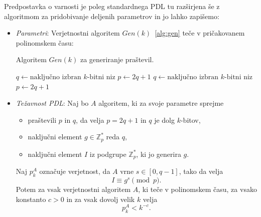 \documentclass[isrm2, tisk]{fmfdelo}
\newcommand{\Z}{\mathbb Z}
\begin{document}
\begin{definicija}
\label{def:asm_dlp}
    Predpostavka o varnosti je poleg standardnega PDL tu razširjena še z algoritmom za pridobivanje 
    deljenih parametrov in jo lahko zapišemo:
    \begin{itemize}
        \item \textit{Parametri}: Verjetnostni algoritem $Gen(k)$~\ref{alg:gen} teče v pričakovanem 
            polinomskem času: 
            \begin{algorithm}
                \caption{Algoritem $Gen(k)$ za generiranje praštevil.}
                \label{alg:gen}
                \begin{algorithmic}
                    \State $q \gets \text{naključno izbran $k$-bitni niz}$
                    \State $p \gets 2q + 1$
                        \State $q \gets \text{naključno izbran $k$-bitni niz}$
                        \State $p \gets 2q + 1$
                    \EndWhile
                    \State {}
                \end{algorithmic}
                
            \end{algorithm}
        \item \textit{Težavnost PDL}: Naj bo $A$ algoritem, ki za svoje parametre sprejme 
            \begin{itemize}
                \item praštevili $p$ in $q$, da velja $p = 2q + 1$ in $q$ je dolg $k$-bitov,
                \item naključni element $g \in \Z_p^*$ reda $q$,
                \item naključni element $I$ iz podgrupe $\Z_p^*$, ki jo generira $g$.
            \end{itemize}
            Naj $p_k^A$ označuje verjetnost, da $A$ vrne $s \in [0, q - 1]$, tako da velja
            $$
            I \equiv g^s \pmod p.
            $$
            Potem za vsak verjetnostni algoritem $A$, ki teče v polinomskem času, za vsako konstanto 
            $c > 0$ in za vsak dovolj velik $k$ velja 
            $$ 
            p_k^A < k^{-c}.
            $$
    \end{itemize}
\end{definicija}
\end{document}
